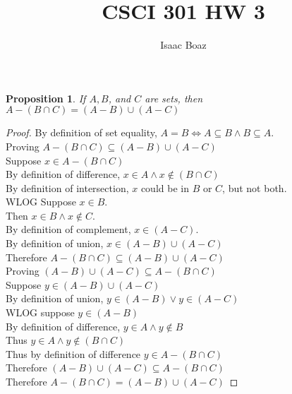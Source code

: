 \documentclass{article}
\title{\vspace{-5ex}CSCI 301 HW 3}
\author{Isaac Boaz}
\newtheorem*{theorem}{Proposition}
\begin{document}
\maketitle

\begin{theorem}
    If \(A, B\), and \(C\) are sets, then \(A- (B \cap C) = (A - B) \cup (A - C)\)
\end{theorem}

\begin{proof}
    By definition of set equality, \(A = B \iff A \subseteq B \land B \subseteq A\). \\
    Proving \(A-(B \cap C) \subseteq (A-B) \cup (A - C)\) \\
    Suppose \(x \in A-(B \cap C)\) \\
    By definition of difference, \(x \in A \land x \notin (B \cap C)\) \\
    By definition of intersection, \(x\) could be in \(B\) or \(C\), but not both. \\
    WLOG Suppose \(x \in B\). \\
    Then \(x \in B \land x \notin C\). \\
    By definition of complement, \(x \in (A - C)\). \\
    By definition of union, \(x \in (A-B) \cup (A - C)\) \\
    Therefore \(A-(B \cap C) \subseteq (A-B) \cup (A - C)\) \\[2ex]
    \noindent
    Proving \((A-B) \cup (A - C) \subseteq A-(B \cap C)\) \\
    Suppose \(y \in (A-B) \cup (A - C)\) \\
    By definition of union, \(y \in (A-B) \lor y \in (A - C)\) \\
    WLOG suppose \(y \in (A-B)\) \\
    By definition of difference, \(y \in A \land y \notin B\) \\
    Thus \(y \in A \land y \notin (B \cap C)\) \\
    Thus by definition of difference \(y \in A-(B \cap C)\) \\
    Therefore \((A-B) \cup (A - C) \subseteq A-(B \cap C)\) \\

    \noindent
    Therefore \(A-(B \cap C) = (A-B) \cup (A - C)\)
\end{proof}
\end{document}
